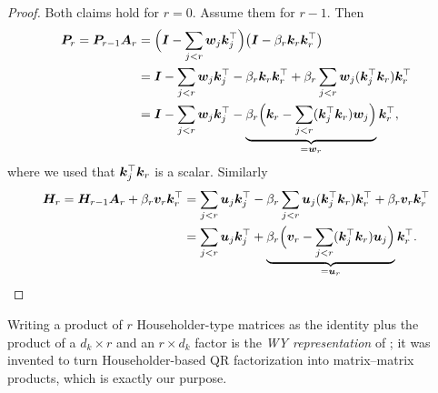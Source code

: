 \begin{proof}
Both claims hold for $r=0$. Assume them for $r-1$. Then
\begin{align*}
  \bm{P}_r=\bm{P}_{r-1}\bm{A}_r
  &=\Big(\bm{I}-\sum_{j<r}\bm{w}_j\bm{k}_j^{\top}\Big)\big(\bm{I}-\beta_r\bm{k}_r\bm{k}_r^{\top}\big)\\
  &=\bm{I}-\sum_{j<r}\bm{w}_j\bm{k}_j^{\top}-\beta_r\bm{k}_r\bm{k}_r^{\top}+\beta_r\sum_{j<r}\bm{w}_j(\bm{k}_j^{\top}\bm{k}_r)\bm{k}_r^{\top}\\
  &=\bm{I}-\sum_{j<r}\bm{w}_j\bm{k}_j^{\top}-\underbrace{\beta_r\Big(\bm{k}_r-\sum_{j<r}(\bm{k}_j^{\top}\bm{k}_r)\bm{w}_j\Big)}_{=\bm{w}_r}\bm{k}_r^{\top} ,
\end{align*}
where we used that $\bm{k}_j^{\top}\bm{k}_r$ is a scalar. Similarly
\begin{align*}
  \bm{H}_r=\bm{H}_{r-1}\bm{A}_r+\beta_r\bm{v}_r\bm{k}_r^{\top}
  &=\sum_{j<r}\bm{u}_j\bm{k}_j^{\top}-\beta_r\sum_{j<r}\bm{u}_j(\bm{k}_j^{\top}\bm{k}_r)\bm{k}_r^{\top}+\beta_r\bm{v}_r\bm{k}_r^{\top}\\
  &=\sum_{j<r}\bm{u}_j\bm{k}_j^{\top}+\underbrace{\beta_r\Big(\bm{v}_r-\sum_{j<r}(\bm{k}_j^{\top}\bm{k}_r)\bm{u}_j\Big)}_{=\bm{u}_r}\bm{k}_r^{\top} .\qedhere
\end{align*}
\end{proof}

Writing a product of $r$ Householder-type matrices as the identity plus the product of a
$d_k\times r$ and an $r\times d_k$ factor is the \emph{WY representation} of
\citet{c03-bischof1987wy}; it was invented to turn Householder-based QR factorization into
matrix--matrix products, which is exactly our purpose.

